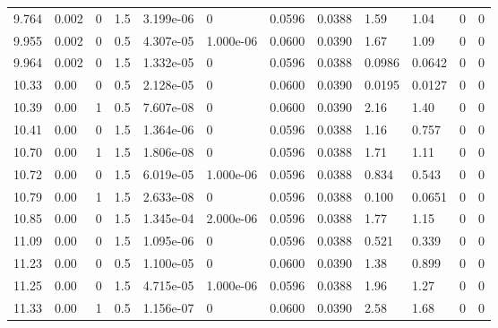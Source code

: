\documentclass[preview]{standalone}
\begin{document}
{{{\begin{tabular}{L{1.2cm}C{1.2cm} C{0.3cm}C{0.5cm} C{1.4cm}C{1.4cm} C{1.4cm}C{1.4cm} C{1.6cm}C{1.6cm} C{1.6cm}C{1.6cm}}
  9.764  &  0.002  & 0     & 1.5 &  3.199e-06  & 0  &  0.0596&   0.0388& 1.59 & 1.04   &  0 & 0  \\ 
  9.955  &  0.002  & 0     & 0.5 &  4.307e-05  & 1.000e-06  &  0.0600&   0.0390& 1.67 & 1.09   &  0 & 0  \\ 
  9.964  &  0.002  & 0     & 1.5 &  1.332e-05  & 0  &  0.0596&   0.0388& 0.0986 & 0.0642   &  0 & 0  \\ 
  10.33  &  0.00  & 0     & 0.5 &  2.128e-05  & 0  &  0.0600&   0.0390& 0.0195 & 0.0127   &  0 & 0  \\ 
  10.39  &  0.00  & 1     & 0.5 &  7.607e-08  & 0  &  0.0600&   0.0390& 2.16 & 1.40   &  0 & 0  \\ 
  10.41  &  0.00  & 0     & 1.5 &  1.364e-06  & 0  &  0.0596&   0.0388& 1.16 & 0.757   &  0 & 0  \\ 
  10.70  &  0.00  & 1     & 1.5 &  1.806e-08  & 0  &  0.0596&   0.0388& 1.71 & 1.11   &  0 & 0  \\ 
  10.72  &  0.00  & 0     & 1.5 &  6.019e-05  & 1.000e-06  &  0.0596&   0.0388& 0.834 & 0.543   &  0 & 0  \\ 
  10.79  &  0.00  & 1     & 1.5 &  2.633e-08  & 0  &  0.0596&   0.0388& 0.100 & 0.0651   &  0 & 0  \\ 
  10.85  &  0.00  & 0     & 1.5 &  1.345e-04  & 2.000e-06  &  0.0596&   0.0388& 1.77 & 1.15   &  0 & 0  \\ 
  11.09  &  0.00  & 0     & 1.5 &  1.095e-06  & 0  &  0.0596&   0.0388& 0.521 & 0.339   &  0 & 0  \\ 
  11.23  &  0.00  & 0     & 0.5 &  1.100e-05  & 0  &  0.0600&   0.0390& 1.38 & 0.899   &  0 & 0  \\ 
  11.25  &  0.00  & 0     & 1.5 &  4.715e-05  & 1.000e-06  &  0.0596&   0.0388& 1.96 & 1.27   &  0 & 0  \\ 
  11.33  &  0.00  & 1     & 0.5 &  1.156e-07  & 0  &  0.0600&   0.0390& 2.58 & 1.68   &  0 & 0  \\ 
\hline 
\end{tabular} 

}}}
\end{document}
